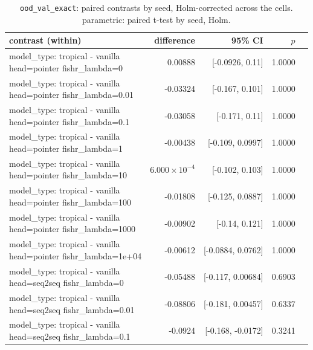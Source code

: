 \documentclass[10pt]{article}
\makeatletter
\newcommand{\stackcell}[1]{\begin{tabular}[t]{@{}l@{}}#1\end{tabular}}
\makeatother
\begin{document}
{\small
\begin{longtable}{lrrrl}
\caption{\texttt{ood\_val\_exact}: paired contrasts by seed, Holm-corrected across the cells. parametric: paired t-test by seed, Holm.}\label{tab:paired-ood_val_exact}\\
\toprule
contrast (within) & difference & 95\% CI & $p$ & \\
\midrule
\endhead
\stackcell{model\_type: tropical - vanilla\\\footnotesize head=pointer fishr\_lambda=0 } & 0.00888 & [-0.0926, 0.11] & 1.0000 & \\
\stackcell{model\_type: tropical - vanilla\\\footnotesize head=pointer fishr\_lambda=0.01 } & -0.03324 & [-0.167, 0.101] & 1.0000 & \\
\stackcell{model\_type: tropical - vanilla\\\footnotesize head=pointer fishr\_lambda=0.1 } & -0.03058 & [-0.171, 0.11] & 1.0000 & \\
\stackcell{model\_type: tropical - vanilla\\\footnotesize head=pointer fishr\_lambda=1 } & -0.00438 & [-0.109, 0.0997] & 1.0000 & \\
\stackcell{model\_type: tropical - vanilla\\\footnotesize head=pointer fishr\_lambda=10 } & $6.000\times10^{-4}$ & [-0.102, 0.103] & 1.0000 & \\
\stackcell{model\_type: tropical - vanilla\\\footnotesize head=pointer fishr\_lambda=100 } & -0.01808 & [-0.125, 0.0887] & 1.0000 & \\
\stackcell{model\_type: tropical - vanilla\\\footnotesize head=pointer fishr\_lambda=1000 } & -0.00902 & [-0.14, 0.121] & 1.0000 & \\
\stackcell{model\_type: tropical - vanilla\\\footnotesize head=pointer fishr\_lambda=1e+04 } & -0.00612 & [-0.0884, 0.0762] & 1.0000 & \\
\stackcell{model\_type: tropical - vanilla\\\footnotesize head=seq2seq fishr\_lambda=0 } & -0.05488 & [-0.117, 0.00684] & 0.6903 & \\
\stackcell{model\_type: tropical - vanilla\\\footnotesize head=seq2seq fishr\_lambda=0.01 } & -0.08806 & [-0.181, 0.00457] & 0.6337 & \\
\stackcell{model\_type: tropical - vanilla\\\footnotesize head=seq2seq fishr\_lambda=0.1 } & -0.0924 & [-0.168, -0.0172] & 0.3241 & \\

\end{longtable}}
\end{document}
